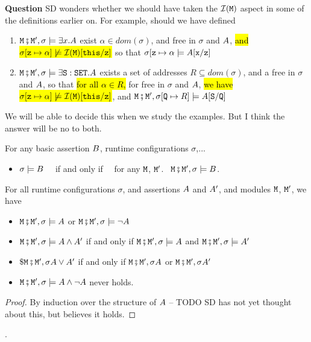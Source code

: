 \noindent
{\bf Question} SD wonders whether we should have taken the ${\mathcal I}(\M)$ aspect in some of
the definitions  earlier on. 
For example, should we have defined
\begin{enumerate}
\item 
$\M\mkpair \M', \sigma \models \exists x.\A$ \IFF  exist  $\alpha\in dom(\sigma)$, and    free in $\sigma$ and $\A$, \hl{and $\sigma[\prg{z}\mapsto \alpha] \not\models {\mathcal I}(\M)[\prg{this}/\prg{z}]$}  so that
$\sigma[\prg{z}\mapsto \alpha \models  \A[\prg{x}/\prg{z}]$ 
\item
$\M\mkpair \M', \sigma \models \exists \prg{S}:\prg{SET}.\A$ \IFF 
 exists a set of addresses $R\subseteq dom(\sigma)$, and a  free in $\sigma$ and $\A$, so that
\hl{for all $\alpha\in R$,} for     free in $\sigma$ and $\A$, \hl{we have }
  \hl{$\sigma[\prg{z}\mapsto \alpha] \not\models {\mathcal I}(\M)[\prg{this}/\prg{z}]$}, and
$\M\mkpair \M', \sigma[\prg{Q}\mapsto R ]\models   \A[\prg{S}/\prg{Q}]$ 
\end{enumerate}
We will be able to decide this when we study the examples. But I think the answer will be no to both.

\begin{lemma}
For any basic assertion $\SA$, runtime configurations $\sigma$,...
\begin{itemize}
\item $\sigma \models \SA$ \ \ if and only if \ \  for any $\M$, $\M'$. \, $\M\mkpair \M', \sigma \models\SA$.
\end{itemize}
\end{lemma}
 
\begin{lemma}
For all runtime configurations $\sigma$, and   assertions $\A$ and $\A'$, and modules
$\M$, $\M'$,
we have
\label{lemma:basic_assertions_classical}
\begin{itemize}
\item
$\M\mkpair \M', \sigma \models \A$ or  $\M\mkpair \M', \sigma \models \neg\A$
\item
$\M\mkpair \M', \sigma \models \A \wedge \A'$ \SP if and only if \SP  $\M\mkpair \M', \sigma \models \A$ and  $\M\mkpair \M', \sigma \models \A'$ 
\item
$\$\M\mkpair \M', \sigma \A \vee \A'$ \SP if and only if \SP $\M\mkpair \M', \sigma \A$ or  $\M\mkpair \M', \sigma \A'$ 
\item
$\M\mkpair \M', \sigma\models \A \wedge \neg\A$ never holds.
\end{itemize}
\end{lemma}
\begin{proof} By induction over the structure of $\A$ -- TODO  SD has not yet thought about this, but believes it holds. \end{proof}.

